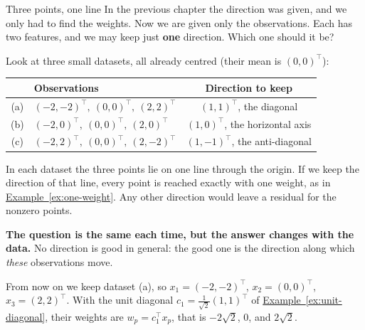 \documentclass[a4paper,12pt,oneside]{report}
\begin{document}
\begin{framedexample}{Three points, one line}\label{ex:pca-three-points}
In the previous chapter the direction was given, and we only had to
find the weights. Now we are given only the observations. Each has
two features, and we may keep just \textbf{one} direction.
Which one should it be?

Look at three small datasets, all already centred (their mean is
$(0,0)^\top$):
\begin{center}
\end{center}
\begin{center}
\begin{tabular}{@{}clc@{}}
\toprule
 & \textbf{Observations} & \textbf{Direction to keep} \\
\midrule
(a) & $(-2,-2)^\top,\ (0,0)^\top,\ (2,2)^\top$ & $(1,1)^\top$, the diagonal \\
(b) & $(-2,0)^\top,\ (0,0)^\top,\ (2,0)^\top$ & $(1,0)^\top$, the horizontal axis \\
(c) & $(-2,2)^\top,\ (0,0)^\top,\ (2,-2)^\top$ & $(1,-1)^\top$, the anti-diagonal \\
\bottomrule
\end{tabular}
\end{center}
In each dataset the three points lie on one line through the origin.
If we keep the direction of that line, every point is reached exactly
with one weight, as in
\hyperref[ex:one-weight]{Example~\ref*{ex:one-weight}}. Any other
direction would leave a residual for the nonzero points.

\textbf{The question is the same each time, but the answer changes
with the data.} No direction is good in general: the good one is the
direction along which \emph{these} observations move.

From now on we keep dataset (a), so $x_1=(-2,-2)^\top$,
$x_2=(0,0)^\top$, $x_3=(2,2)^\top$. With the unit diagonal
$c_1=\frac1{\sqrt2}(1,1)^\top$ of
\hyperref[ex:unit-diagonal]{Example~\ref*{ex:unit-diagonal}},
their weights are $w_p=c_1^\top x_p$, that is
$-2\sqrt2$, $0$, and $2\sqrt2$.
\end{framedexample}
\end{document}
